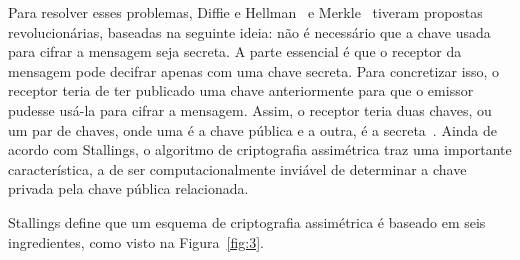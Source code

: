 \documentclass{article}
\begin{document}
Para resolver esses problemas, Diffie e Hellman~\cite{Diffie:article:1976:sep}
e Merkle~\cite{Merkle:phd:1979:jun} tiveram propostas revolucionárias, baseadas
na seguinte ideia: não é necessário que a chave usada para cifrar a mensagem
seja secreta. A parte essencial é que o receptor da mensagem pode decifrar
apenas com uma chave secreta. Para concretizar isso, o receptor teria de ter
publicado uma chave anteriormente para que o emissor pudesse usá-la para cifrar
a mensagem. Assim, o receptor teria duas chaves, ou um par de chaves, onde uma
é a chave pública e a outra, é a secreta~\cite{Paar:book:2009}. Ainda de acordo
com Stallings, o algoritmo de criptografia assimétrica traz uma importante
característica, a de ser computacionalmente inviável de determinar a chave
privada pela chave pública relacionada.

Stallings define que um esquema de criptografia assimétrica é baseado em seis
ingredientes, como visto na Figura~\ref{fig:3}.
\end{document}
